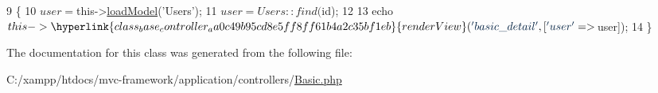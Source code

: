 \begin{DoxyCode}
9                                    \{
10         $user = $this->\hyperlink{class_base_controller_a5fa8890bd3a9d20f5c0cc2377dc49eb1}{loadModel}(\textcolor{stringliteral}{'Users'});
11         $user = Users::find($id);
12 
13         echo $this->\hyperlink{class_base_controller_aa0c49b95cd8e5ff8ff61b4a2c35bf1eb}{renderView}(\textcolor{stringliteral}{'basic\_detail'}, [\textcolor{stringliteral}{'user'} => $user]);
14     \}
\end{DoxyCode}


The documentation for this class was generated from the following file\+:\begin{DoxyCompactItemize}
\item 
C\+:/xampp/htdocs/mvc-\/framework/application/controllers/\hyperlink{controllers_2_basic_8php}{Basic.\+php}\end{DoxyCompactItemize}
